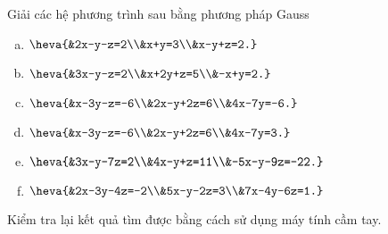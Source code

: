 \begin{bt}
	Giải các hệ phương trình sau bằng phương pháp Gauss
	\begin{enumerate}[a)]
		\item $\heva{&2x-y-z=2\\&x+y=3\\&x-y+z=2.}$
		\item $\heva{&3x-y-z=2\\&x+2y+z=5\\&-x+y=2.}$
		\item $\heva{&x-3y-z=-6\\&2x-y+2z=6\\&4x-7y=-6.}$
		\item $\heva{&x-3y-z=-6\\&2x-y+2z=6\\&4x-7y=3.}$
		\item $\heva{&3x-y-7z=2\\&4x-y+z=11\\&-5x-y-9z=-22.}$
		\item $\heva{&2x-3y-4z=-2\\&5x-y-2z=3\\&7x-4y-6z=1.}$
	\end{enumerate}
	Kiểm tra lại kết quả tìm được bằng cách sử dụng máy tính cầm tay.
\end{bt}
